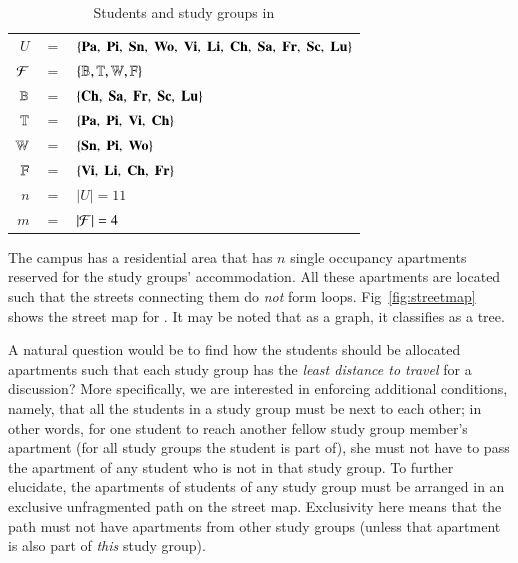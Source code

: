 \documentclass[MS,synopsis]{iitmdiss}
\begin{document}

\begin{table}[htbp]
  \centering
  \begin{tabular}{rcl}
    $U $&$=$&$ \{{\bf Pa},\; {\bf Pi},\; {\bf Sn},\; {\bf Wo},\; {\bf Vi},\; {\bf Li},\; {\bf Ch},\;
    {\bf Sa},\; {\bf Fr},\; {\bf Sc},\; {\bf Lu}\}$\\
    ${\cal F} $&$=$&$ \{\mathbb{B}, \mathbb{T}, \mathbb{W}, \mathbb{F}\}$\\
    $\mathbb{B} $&$=$&$ \{{\bf Ch},\;  {\bf Sa},\;  {\bf Fr},\;  {\bf Sc},\;  {\bf Lu} \}$\\
    $\mathbb{T} $&$=$&$ \{{\bf Pa},\;  {\bf Pi},\;  {\bf Vi},\;  {\bf Ch} \}$\\
    $\mathbb{W} $&$=$&$ \{{\bf Sn},\;  {\bf Pi},\;  {\bf Wo} \}$\\
    $\mathbb{F} $&$=$&$ \{{\bf Vi},\;  {\bf Li},\;  {\bf Ch},\;  {\bf Fr} \}$\\
    $n $&$=$&$ |U| = 11$\\
    $m $&$=$&$ |{\cal F}| = 4$      
  \end{tabular}
  \caption{Students and study groups in \WSI}
  \label{tab:wsigroups}
\end{table}

The campus has a residential area {\residenceblock} that has $n$
single occupancy apartments reserved for the study groups'
accommodation.  All these apartments are located such that the streets
connecting them do {\em not} form loops. Fig~\ref{fig:streetmap} shows
the street map for {\residenceblock}. It may be noted that as a graph, it
classifies as a tree.


A natural question would be to find how the students should be
allocated apartments such that each study group has the {\em least
  distance to travel} for a discussion? More specifically, we are
interested in enforcing additional conditions, namely, that all the
students in a study group must be next to each other; in other words,
for one student to reach another fellow study group member's apartment
(for all study groups the student is part of), she must not have to
pass the apartment of any student who is not in that study group. To
further elucidate, the apartments of students of any study group must
be arranged in an exclusive unfragmented path on the street
map. Exclusivity here means that the path must not have apartments
from other study groups (unless that apartment is also part of {\em
  this} study group).
\end{document}
